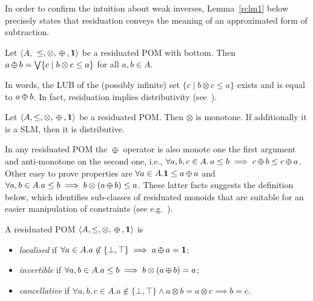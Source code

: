 \documentclass{llncs}
\def\1{{\mathbf 1}}
\def\monid{{\mathbf 0}}
\def\1{{\mathbf 1}}
\def\monop{\otimes}
\def\odiv{\, {\ominus\hspace{-7.7pt} \div} \,}
\def\monid{\mathbf{1}}
\begin{document}
%

In order to confirm the intuition about weak inverses,
Lemma~\ref{rclm1} below precisely states that residuation conveys the meaning of 
an approximated form of subtraction.
%

\begin{lemma}\label{rclm1}
	Let $\langle A,$ $\leq, \otimes,  \odiv, \1 \rangle$ be a residuated POM with bottom.
	Then $a \odiv b = \bigvee \{c \mid b \otimes c \leq a\}$ for all $a, b \in A$.
\end{lemma}

In words, the LUB of the (possibly infinite) set 
$\{c \mid b \otimes c \leq a\}$ exists and is equal to $a \odiv b$.
%
In fact, residuation implies distributivity (see~\cite[Lemma 2.2]{ipl17}).

\begin{lemma}\label{rclm2}
	Let $\langle A, \leq, \monop, \odiv, \1 \rangle$ be a residuated POM. 
	Then $\monop$ is monotone.
	If additionally it is a SLM, then it is distributive.
\end{lemma}



In any residuated POM the $\odiv$ operator is also monote one the first argument and 
anti-monotone on the second one, i.e., 
$\forall a, b, c \in A.\, a\leq b \implies  c\odiv b \leq c \odiv a$.
%
Other easy to prove properties are
$\forall a\in A. \monid \leq a \odiv a$ and
$\forall a, b \in A. a \leq b \implies b \monop (a \odiv b) \leq a$.
These latter facts suggests the definition below, which identifies sub-classes 
of residuated monoids that are suitable for an easier manipulation
of constraints (see e.g.~\cite{ecai06}).

\begin{definition}[families]
	A residuated POM $\langle A, \leq, \monop, \odiv, \monid \rangle$ is
	\begin{itemize}
		\item
		\emph{localised} if $\forall a \in A. a \not \in \{\bot,\top\} \implies a \odiv a = \1$;
		\item
		\emph{invertible} if $\forall a, b \in A. a \leq b \implies b \monop (a \odiv b) = a$;
		\item
		\emph{cancellative} if $\forall a, b, c \in A. a \not \in \{\bot,\top\} \wedge a \otimes b = a  \otimes c \implies b = c$.
	\end{itemize}
\end{definition}
\end{document}
